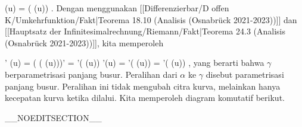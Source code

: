 \mavergleichskette
{\vergleichskette
{  \gamma (u)
}
{ = }{  \alpha( \beta(u))
}
{  }{
}
{    }{
}
{   }{
}
}
{}{}{.}
Dengan menggunakan
[[Differenzierbar/D offen K/Umkehrfunktion/Fakt|Teorema 18.10 (Analisis (Osnabrück 2021-2023))]]
dan
[[Hauptsatz der Infinitesimalrechnung/Riemann/Fakt|Teorema 24.3 (Analisis (Osnabrück 2021-2023))]],
kita memperoleh

\mavergleichskettealign
{\vergleichskettealign
{ \gamma' (u)
}
{ =} { ( \alpha( \beta(u)))'
}
{ =} { \alpha'( \beta(u)) \beta'(u)
}
{ =} { \alpha'( \beta(u)) {  }
}
{ =} { \alpha'( \beta(u)) {  }
}
}
{}
{}{,}
yang berarti bahwa $\gamma$ berparametrisasi panjang busur. Peralihan dari $\alpha$ ke $\gamma$ disebut parametrisasi panjang busur. Peralihan ini tidak mengubah citra kurva, melainkan hanya kecepatan kurva ketika dilalui. Kita memperoleh diagram komutatif berikut.

 {  }

__NOEDITSECTION__

